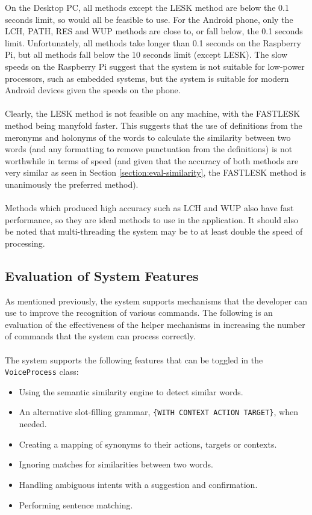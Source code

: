 \documentclass[11pt]{article}
\begin{document}
On the Desktop PC, all methods except the LESK method are below the 0.1 seconds limit, so would all be feasible to use. For the Android phone, only the LCH, PATH, RES and WUP methods are close to, or fall below, the 0.1 seconds limit. Unfortunately, all methods take longer than 0.1 seconds on the Raspberry Pi, but all methods fall below the 10 seconds limit (except LESK). The slow speeds on the Raspberry Pi suggest that the system is not suitable for low-power processors, such as embedded systems, but the system is suitable for modern Android devices given the speeds on the phone.
\\
\\
Clearly, the LESK method is not feasible on any machine, with the FASTLESK method being manyfold faster. This suggests that the use of definitions from the meronyms and holonyms of the words to calculate the similarity between two words (and any formatting to remove punctuation from the definitions) is not worthwhile in terms of speed (and given that the accuracy of both methods are very similar as seen in Section \ref{section:eval-similarity}, the FASTLESK method is unanimously the preferred method).
\\
\\
Methods which produced high accuracy such as LCH and WUP also have fast performance, so they are ideal methods to use in the application. It should also be noted that multi-threading the system may be to at least double the speed of processing.

\subsection{Evaluation of System Features}

As mentioned previously, the system supports mechanisms that the developer can use to improve the recognition of various commands. The following is an evaluation of the effectiveness of the helper mechanisms in increasing the number of commands that the system can process correctly.
\\
\\
The system supports the following features that can be toggled in the \texttt{VoiceProcess} class:

\begin{itemize}
\item Using the semantic similarity engine to detect similar words.
\item An alternative slot-filling grammar, \texttt{\{WITH CONTEXT ACTION TARGET\}}, when needed.
\item Creating a mapping of synonyms to their actions, targets or contexts.
\item Ignoring matches for similarities between two words.
\item Handling ambiguous intents with a suggestion and confirmation.
\item Performing sentence matching.
\end{itemize}
\end{document}
